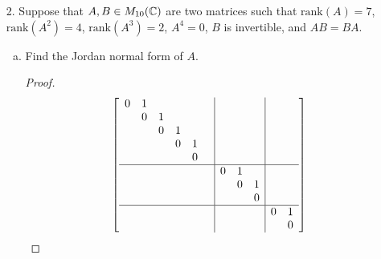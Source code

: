 \begin{itemize}
\begin{enumerate}[(a)]
\item Let $S : V \rar V$ be both unitary and self-adjoint. Prove that $S$ is a
difference of two orthogonal projections with orthogonal ranges.
\begin{proof}
    Write $$Sx = \frac{x+Sx}{2} - \frac{x-Sx}{2}.$$
    Since $S$ is unitary, $SS^* = S^*S = 1$, so self-adjointness gives $S^2 = I$. Letting $A$ be the RHS above and $B$ the LHS, $A^2 = \frac{1}{4}(I + 2S + S^2) = \frac{1}{4}(2I + 2S) = A$. Additionally, $A^* = A$, so $A$ is an orthogonal projection. $B$ can be verified similarly. Finally, $S$ unitary means it is norm-preserving, hence
    \begin{align*}
        \ip{\frac{x+Sx}{2}}{\frac{x+Sx}{2}} &= \frac{1}{4}(\ip{x}{x} + \ip{Sx}{x} - \ip{x}{Sx} - \ip{Sx}{Sx}) \\
        &= \frac{1}{4}(\ip{x}{x} + \ip{Sx}{x} - \ip{Sx}{x} - \ip{Sx}{Sx}) \\
        &= \frac{1}{4}(\ip{x}{x} - \ip{Sx}{Sx}) \\
        &=0. 
    \end{align*}
\end{proof}
\end{enumerate}












\item[2.] Suppose that $A, B \in M_{10}(\mathbb{C})$ are two matrices such that $\text{rank}(A) = 7$, $\text{rank}(A^2) = 4$, $\text{rank}(A^3) = 2$, $A^4 = 0$, $B$ is invertible, and $AB = BA$.
\begin{enumerate}[(a)]
\item Find the Jordan normal form of $A$.
\begin{proof}
$$    \left[ 
    \begin{array}{c|c|c} 
      \begin{matrix}
        0 & 1 & & & \\
        & 0 & 1 & & \\
        & & 0 & 1 & \\
        & & & 0 & 1 \\
        & & & & 0 & \\
    \end{matrix} &  &  \\ 
      \hline 
       & \begin{matrix}
  0 & 1 \\
  & 0 & 1 \\
  & & 0 \\
  \end{matrix} &  \\
      \hline
       &  & \begin{matrix}
  0 & 1 \\
   & 0  \\
  \end{matrix}
    \end{array} 
    \right] $$
\end{proof}


\end{enumerate}
\end{itemize}
